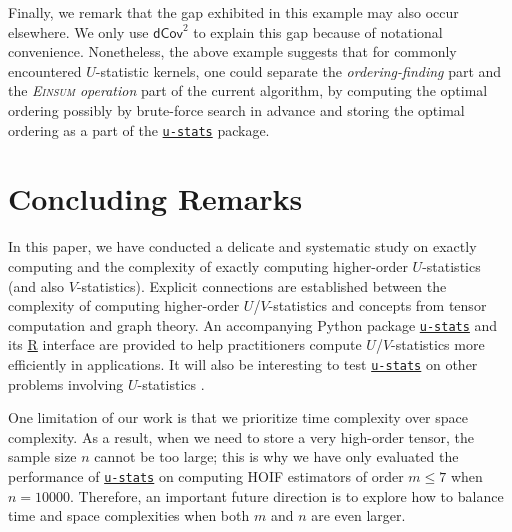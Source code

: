 \documentclass[12pt]{article}
\newcommand{\libref}[2]{\href{#2}{\texttt{#1}}}
\def\package{\libref{u-stats}{https://github.com/zrq1706/U-Statistics-Python}}
\theoremstyle{plain}
\theoremstyle{definition}
\def\Einsum{\textsc{Einsum}}
\newcommand{\Lin}[1]{{\color{purple}{#1}}}
\def\package{\libref{u-stats}{https://github.com/zrq1706/U-Statistics-Python}}
\begin{document}
\begin{bibunit}[agsm]
\Lin{to add}

Finally, we remark that the gap exhibited in this example may also occur elsewhere. We only use $\mathsf{dCov}^{2}$ to explain this gap because of notational convenience. Nonetheless, the above example suggests that for commonly encountered $U$-statistic kernels, one could separate the \emph{ordering-finding} part and the \emph{\Einsum{} operation} part of the current algorithm, by computing the optimal ordering possibly by brute-force search in advance and storing the optimal ordering as a part of the \package{} package.
\fi



\section{Concluding Remarks}
\label{sec:conclusions}

In this paper, we have conducted a delicate and systematic study on exactly computing and the complexity of exactly computing higher-order $U$-statistics (and also $V$-statistics). Explicit connections are established between the complexity of computing higher-order $U$/$V$-statistics and concepts from tensor computation and graph theory. An accompanying Python package \package{} and its \href{https://github.com/cxy0714/U-Statistics-R}{R} interface are provided to help practitioners compute $U$/$V$-statistics more efficiently in applications. %
It will also be interesting to test \package{} on other problems involving $U$-statistics \citep{shen2025engression}. 

One limitation of our work is that we prioritize time complexity over space complexity. As a result, when we need to store a very high-order tensor, the sample size $n$ cannot be too large; this is why we have only evaluated the performance of \package{} on computing HOIF estimators of order $m \leq 7$ when $n = 10000$. %
Therefore, an important future direction is to explore how to balance time and space complexities when both $m$ and $n$ are even larger.



\end{bibunit}
\end{document}

